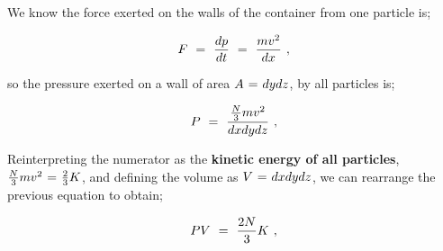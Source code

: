 \documentclass{article}
\begin{document}
We know the force exerted on the walls of the container from one particle is;

\begin{equation} \label{eq:256}
F \hspace{0.125cm} = \hspace{0.125cm} \frac{d p}{d t} \hspace{0.125cm} = \hspace{0.125cm} \frac{m v^2}{d x} \hspace{0.125cm} ,
\end{equation}

so the pressure exerted on a wall of area \begin{math} A \hspace{0.025cm} = \hspace{0.025cm} dy dz \end{math}, by all particles is;

\begin{equation} \label{eq:256}
P \hspace{0.125cm} = \hspace{0.125cm} \frac{\frac{N}{3} m v^2}{d x dy dz} \hspace{0.125cm} ,
\end{equation}

Reinterpreting the numerator as the \textbf{kinetic energy of all particles}, \begin{math} \frac{N}{3} m v^2 \hspace{0.025cm} = \hspace{0.025cm} \frac{2}{3} K \end{math}, and defining the volume as \begin{math} V \hspace{0.025cm} = \hspace{0.025cm} dx dy dz \end{math}, we can rearrange the previous equation to obtain;

\begin{equation} \label{eq:256}
P V \hspace{0.125cm} = \hspace{0.125cm} \frac{2N}{3} K \hspace{0.125cm} ,
\end{equation}
\end{document}
